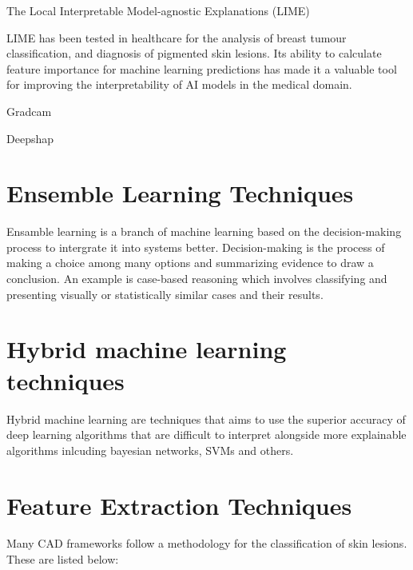 The Local Interpretable Model-agnostic Explanations (LIME)

LIME has been tested in healthcare for the analysis of breast tumour classification\cite{rafferty2022}, and diagnosis of pigmented skin lesions\cite{duell2021}. Its ability to calculate feature importance for machine learning predictions has made it a valuable tool for improving the interpretability of AI models in the medical domain.

Gradcam

Deepshap


\section{Ensemble Learning Techniques}
Ensamble learning is a branch of machine learning based on the decision-making process to intergrate it into systems better\cite{xu2022}. Decision-making is the process of making a choice among many options and summarizing evidence to draw a conclusion. An example is case-based reasoning which involves classifying and presenting visually or statistically similar cases and their results.


\section{Hybrid machine learning techniques}
Hybrid machine learning are techniques that aims to use the superior accuracy of deep learning algorithms that are difficult to interpret alongside more explainable algorithms inlcuding bayesian networks, SVMs and others.

\section{Feature Extraction Techniques}
Many CAD frameworks follow a methodology for the classification of skin lesions. These are listed below:

